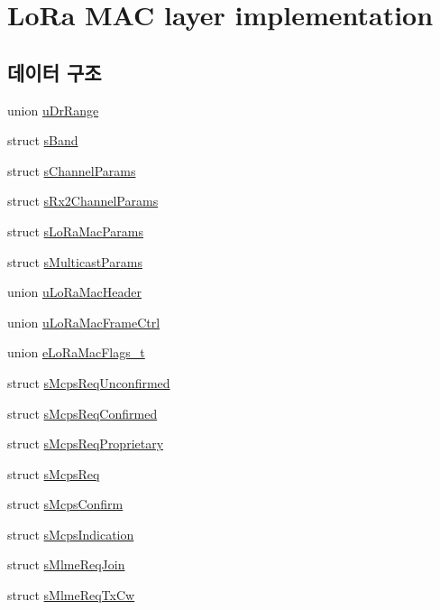 \hypertarget{group___l_o_r_a_m_a_c}{}\section{Lo\+Ra M\+AC layer implementation}
\label{group___l_o_r_a_m_a_c}
\subsection*{데이터 구조}
\begin{DoxyCompactItemize}
\item 
union \mbox{\hyperlink{unionu_dr_range}{u\+Dr\+Range}}
\item 
struct \mbox{\hyperlink{structs_band}{s\+Band}}
\item 
struct \mbox{\hyperlink{structs_channel_params}{s\+Channel\+Params}}
\item 
struct \mbox{\hyperlink{structs_rx2_channel_params}{s\+Rx2\+Channel\+Params}}
\item 
struct \mbox{\hyperlink{structs_lo_ra_mac_params}{s\+Lo\+Ra\+Mac\+Params}}
\item 
struct \mbox{\hyperlink{structs_multicast_params}{s\+Multicast\+Params}}
\item 
union \mbox{\hyperlink{unionu_lo_ra_mac_header}{u\+Lo\+Ra\+Mac\+Header}}
\item 
union \mbox{\hyperlink{unionu_lo_ra_mac_frame_ctrl}{u\+Lo\+Ra\+Mac\+Frame\+Ctrl}}
\item 
union \mbox{\hyperlink{unione_lo_ra_mac_flags__t}{e\+Lo\+Ra\+Mac\+Flags\+\_\+t}}
\item 
struct \mbox{\hyperlink{structs_mcps_req_unconfirmed}{s\+Mcps\+Req\+Unconfirmed}}
\item 
struct \mbox{\hyperlink{structs_mcps_req_confirmed}{s\+Mcps\+Req\+Confirmed}}
\item 
struct \mbox{\hyperlink{structs_mcps_req_proprietary}{s\+Mcps\+Req\+Proprietary}}
\item 
struct \mbox{\hyperlink{structs_mcps_req}{s\+Mcps\+Req}}
\item 
struct \mbox{\hyperlink{structs_mcps_confirm}{s\+Mcps\+Confirm}}
\item 
struct \mbox{\hyperlink{structs_mcps_indication}{s\+Mcps\+Indication}}
\item 
struct \mbox{\hyperlink{structs_mlme_req_join}{s\+Mlme\+Req\+Join}}
\item 
struct \mbox{\hyperlink{structs_mlme_req_tx_cw}{s\+Mlme\+Req\+Tx\+Cw}}

\end{DoxyCompactItemize}
